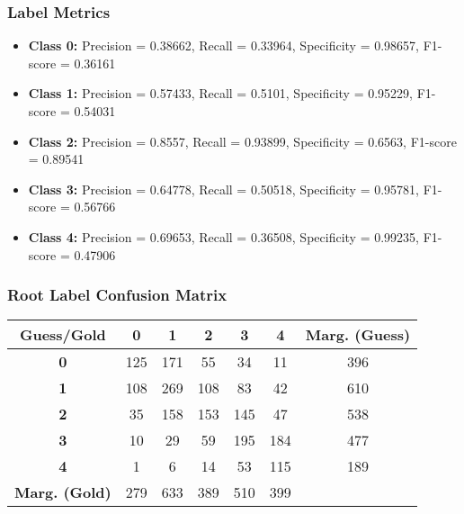 \subsubsection{Label Metrics}
\begin{itemize}
	\item \textbf{Class 0:} Precision = 0.38662, Recall = 0.33964, Specificity = 0.98657, F1-score = 0.36161
	\item \textbf{Class 1:} Precision = 0.57433, Recall = 0.5101,  Specificity = 0.95229, F1-score = 0.54031
	\item \textbf{Class 2:} Precision = 0.8557,  Recall = 0.93899, Specificity = 0.6563,  F1-score = 0.89541
	\item \textbf{Class 3:} Precision = 0.64778, Recall = 0.50518, Specificity = 0.95781, F1-score = 0.56766
	\item \textbf{Class 4:} Precision = 0.69653, Recall = 0.36508, Specificity = 0.99235, F1-score = 0.47906
\end{itemize}

\subsubsection{Root Label Confusion Matrix}
\begin{table}[h]
	\centering
	\begin{tabular}{c|ccccc|c}
		\textbf{Guess/Gold}   & \textbf{0} & \textbf{1} & \textbf{2} & \textbf{3} & \textbf{4} & \textbf{Marg. (Guess)} \\
		\hline
		\textbf{0}            & 125        & 171        & 55         & 34         & 11         & 396                    \\
		\textbf{1}            & 108        & 269        & 108        & 83         & 42         & 610                    \\
		\textbf{2}            & 35         & 158        & 153        & 145        & 47         & 538                    \\
		\textbf{3}            & 10         & 29         & 59         & 195        & 184        & 477                    \\
		\textbf{4}            & 1          & 6          & 14         & 53         & 115        & 189                    \\
		\hline
		\textbf{Marg. (Gold)} & 279        & 633        & 389        & 510        & 399        &                        \\
	\end{tabular}
\end{table}

